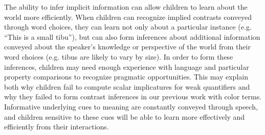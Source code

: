 \documentclass[10pt,letterpaper]{article}
\begin{document}
The ability to infer implicit information can allow children to learn about the world more efficiently.  When children can recognize implied contrasts conveyed through word choices, they can learn not only about a particular instance (e.g. ``This is a small tibu''), but can also form inferences about additional information conveyed about the speaker's knowledge or perspective of the world from their word choices (e.g. tibus are likely to vary by size).  In order to form these inferences, children may need enough experience with language and particular property comparisons to recognize pragmatic opportunities.  This may explain both why children fail to compute scalar implicatures for weak quantifiers and why they failed to form contrast inferences in our previous work with color terms.  Informative underlying cues to meaning are constantly conveyed through speech, and children sensitive to these cues will be able to learn more effectively and efficiently from their interactions. 



\end{document}
